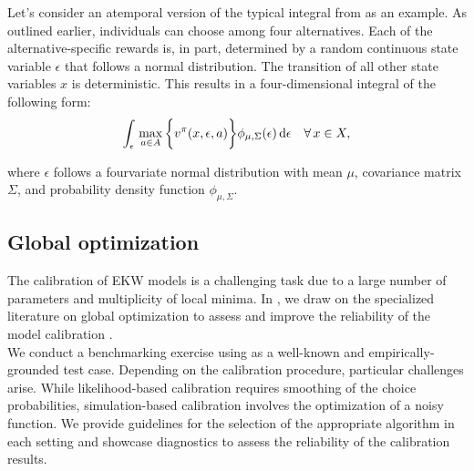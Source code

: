 \noindent Let's consider an atemporal version of the typical integral from \citet{Keane.1994} as an example. As outlined earlier, individuals can choose among four alternatives. Each of the alternative-specific rewards is, in part, determined by a random continuous state variable $\epsilon$ that follows a normal distribution. The transition of all other state variables $x$ is deterministic. This results in a four-dimensional integral of the following form:
%
\begin{align*}
   \int_{\epsilon}\, \max_{a\in A} \bigg\{v^\pi(x, \epsilon, a)\bigg\} \phi_{\mu, \Sigma}(\epsilon) \mathop{}\!\mathrm{d}\epsilon \quad\forall\, x \in X,
\end{align*}

\noindent where $\epsilon$ follows a fourvariate normal distribution with mean $\mu$, covariance matrix $ \Sigma$, and probability density function $\phi_{\mu, \Sigma}$.
\subsection{Global optimization}
The calibration of EKW models is a challenging task due to a large number of parameters and multiplicity of local minima. In \citet{Gabler.2020}, we draw on the specialized literature on global optimization to assess and improve the reliability of the model calibration \citep{Locatelli.2013, Nocedal.2006}.\\

\noindent We conduct a benchmarking exercise using \citet{Keane.1994, Keane.1997} as a well-known and empirically-grounded test case. Depending on the calibration procedure, particular challenges arise. While likelihood-based calibration requires smoothing of the choice probabilities, simulation-based calibration involves the optimization of a noisy function. We provide guidelines for the selection of the appropriate algorithm in each setting and showcase diagnostics to assess the reliability of the calibration results.
